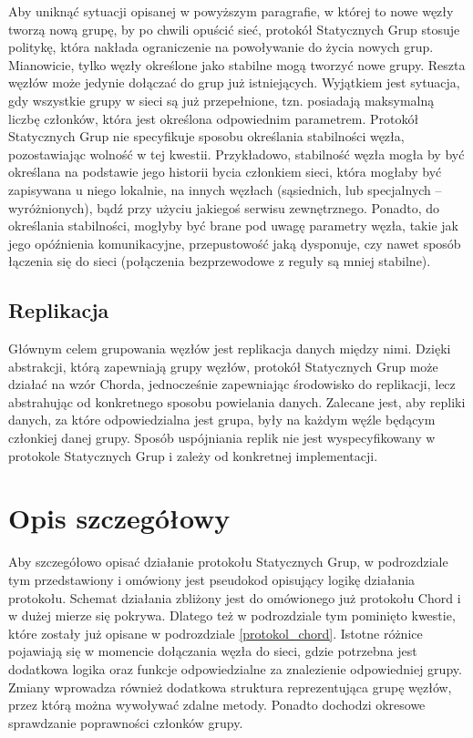 \documentclass[12pt, twoside, openany]{report}
\begin{document}
Aby uniknąć sytuacji opisanej w powyższym paragrafie, w której to nowe węzły tworzą nową grupę, by po chwili opuścić sieć, protokół Statycznych Grup stosuje politykę, która nakłada ograniczenie na powoływanie do życia nowych grup. Mianowicie, tylko węzły określone jako stabilne mogą tworzyć nowe grupy. Reszta węzłów może jedynie dołączać do grup już istniejących. Wyjątkiem jest sytuacja, gdy wszystkie grupy w sieci są już przepełnione, tzn. posiadają maksymalną liczbę członków, która jest określona odpowiednim parametrem. Protokół Statycznych Grup nie specyfikuje sposobu określania stabilności węzła, pozostawiając wolność w tej kwestii. Przykładowo, stabilność węzła mogła by być określana na podstawie jego historii bycia członkiem sieci, która mogłaby być zapisywana u niego lokalnie, na innych węzłach (sąsiednich, lub specjalnych -- wyróżnionych), bądź przy użyciu jakiegoś serwisu zewnętrznego. Ponadto, do określania stabilności, mogłyby być brane pod uwagę parametry węzła, takie jak jego opóźnienia komunikacyjne, przepustowość jaką dysponuje, czy nawet sposób łączenia się do sieci (połączenia bezprzewodowe z reguły są mniej stabilne).

\subsection{Replikacja}
Głównym celem grupowania węzłów jest replikacja danych między nimi. Dzięki abstrakcji, którą zapewniają grupy węzłów, protokół Statycznych Grup może działać na wzór Chorda, jednocześnie zapewniając środowisko do replikacji, lecz abstrahując od konkretnego sposobu powielania danych. Zalecane jest, aby repliki danych, za które odpowiedzialna jest grupa, były na każdym węźle będącym członkiej danej grupy. Sposób uspójniania replik nie jest wyspecyfikowany w protokole Statycznych Grup i zależy od konkretnej implementacji.

\section{Opis szczegółowy}

Aby szczegółowo opisać działanie protokołu Statycznych Grup, w podrozdziale tym przedstawiony i omówiony jest pseudokod opisujący logikę działania protokołu. Schemat działania zbliżony jest do omówionego już protokołu Chord i w dużej mierze się pokrywa. Dlatego też w podrozdziale tym pominięto kwestie, które zostały już opisane w podrozdziale \ref{protokol_chord}. Istotne różnice pojawiają się w momencie dołączania węzła do sieci, gdzie potrzebna jest dodatkowa logika oraz funkcje odpowiedzialne za znalezienie odpowiedniej grupy. Zmiany wprowadza również dodatkowa struktura reprezentująca grupę węzłów, przez którą można wywoływać zdalne metody. Ponadto dochodzi okresowe sprawdzanie poprawności członków grupy.
\end{document}
